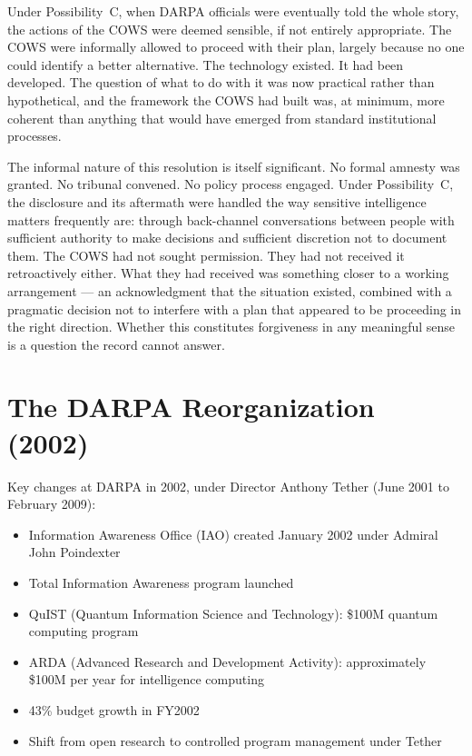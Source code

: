 Under Possibility~C, when DARPA officials were eventually told the whole story, the actions of the COWS were deemed sensible, if not entirely appropriate. The COWS were informally allowed to proceed with their plan, largely because no one could identify a better alternative. The technology existed. It had been developed. The question of what to do with it was now practical rather than hypothetical, and the framework the COWS had built was, at minimum, more coherent than anything that would have emerged from standard institutional processes.

The informal nature of this resolution is itself significant. No formal amnesty was granted. No tribunal convened. No policy process engaged. Under Possibility~C, the disclosure and its aftermath were handled the way sensitive intelligence matters frequently are: through back-channel conversations between people with sufficient authority to make decisions and sufficient discretion not to document them. The COWS had not sought permission. They had not received it retroactively either. What they had received was something closer to a working arrangement --- an acknowledgment that the situation existed, combined with a pragmatic decision not to interfere with a plan that appeared to be proceeding in the right direction. Whether this constitutes forgiveness in any meaningful sense is a question the record cannot answer.

\section*{The DARPA Reorganization (2002)}
\label{pos26:the-darpa-reorganization-2002}


Key changes at DARPA in 2002, under Director Anthony Tether (June 2001 to February 2009):

\begin{itemize}
\item Information Awareness Office (IAO) created January 2002 under Admiral John Poindexter
\item Total Information Awareness program launched
\item QuIST (Quantum Information Science and Technology): \$100M quantum computing program
\item ARDA (Advanced Research and Development Activity): approximately \$100M per year for intelligence computing
\item 43\% budget growth in FY2002
\item Shift from open research to controlled program management under Tether
\end{itemize}

